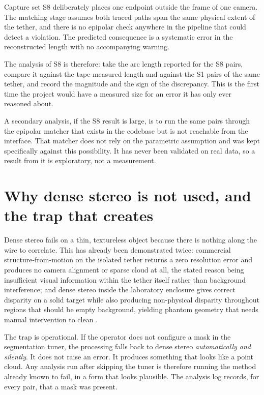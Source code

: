 Capture set S8 deliberately places one endpoint outside the frame of one
camera. The matching stage assumes both traced paths span the same physical
extent of the tether, and there is no epipolar check anywhere in the pipeline
that could detect a violation. The predicted consequence is a systematic
error in the reconstructed length with no accompanying warning.

The analysis of S8 is therefore: take the arc length reported for the S8
pairs, compare it against the tape-measured length and against the S1 pairs
of the same tether, and record the magnitude and the sign of the discrepancy.
This is the first time the project would have a measured size for an error it
has only ever reasoned about.

A secondary analysis, if the S8 result is large, is to run the same pairs
through the epipolar matcher that exists in the codebase but is not reachable
from the interface. That matcher does not rely on the parametric assumption
and was kept specifically against this possibility. It has never been
validated on real data, so a result from it is exploratory, not a
measurement.

\section{Why dense stereo is not used, and the trap that creates}
\label{sec:no-dense}

Dense stereo fails on a thin, textureless object because there is nothing
along the wire to correlate. This has already been demonstrated twice:
commercial structure-from-motion on the isolated tether returns a zero
resolution error and produces no camera alignment or sparse cloud at all, the
stated reason being insufficient visual information within the tether itself
rather than background interference; and dense stereo inside the laboratory
enclosure gives correct disparity on a solid target while also producing
non-physical disparity throughout regions that should be empty background,
yielding phantom geometry that needs manual intervention to clean
\cite{linku_d5_camera_report}.

The trap is operational. If the operator does not configure a mask in the
segmentation tuner, the processing falls back to dense stereo
\emph{automatically and silently}. It does not raise an error. It produces
something that looks like a point cloud. Any analysis run after skipping the
tuner is therefore running the method already known to fail, in a form that
looks plausible. The analysis log records, for every pair, that a mask was
present.

